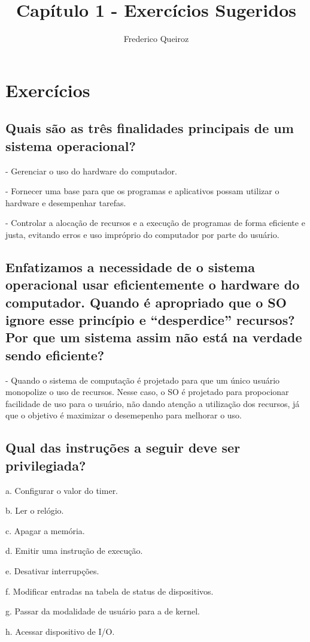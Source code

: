 \documentclass[a4paper, 10pt]{article}
\author{Frederico Queiroz}
\title{Capítulo 1 - Exercícios Sugeridos}
\begin{document}
\maketitle

\section{Exercícios}

\subsection{Quais são as três finalidades principais de um sistema operacional?}
- Gerenciar o uso do hardware do computador.

- Fornecer uma base para que os programas e aplicativos possam utilizar o hardware e desempenhar tarefas.

- Controlar a alocação de recursos e a execução de programas de forma eficiente e justa, evitando erros e uso impróprio do computador por parte do usuário.

\setcounter{subsection}{3}
\subsection{Enfatizamos a necessidade de o sistema operacional usar eficientemente o hardware do computador. Quando é apropriado que o SO ignore esse princípio e %
``desperdice'' recursos? Por que um sistema assim não está na verdade sendo eficiente?}

- Quando o sistema de computação é projetado para que um único usuário monopolize o uso de recursos. Nesse caso, o SO é projetado para propocionar facilidade de uso para %
o usuário, não dando atenção a utilização dos recursos, já que o objetivo é maximizar o desemepenho para melhorar o uso.

\setcounter{subsection}{7}
\subsection{Qual das instruções a seguir deve ser privilegiada?}

a. Configurar o valor do timer.

b. Ler o relógio.

c. Apagar a memória.

d. Emitir uma instrução de execução.

e. Desativar interrupções.

f. Modificar entradas na tabela de status de dispositivos.

g. Passar da modalidade de usuário para a de kernel.

h. Acessar dispositivo de I/O.
\end{document}
